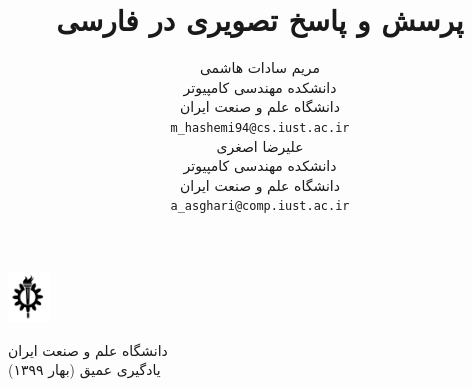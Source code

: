 \documentclass{article}
\title{پرسش و پاسخ تصویری در فارسی}
\author{%
  مریم سادات هاشمی \\
  دانشکده مهندسی کامپیوتر\\
  دانشگاه علم و صنعت ایران\\
  \texttt{m\_hashemi94@cs.iust.ac.ir} \\
   \And
    علیرضا اصغری \\
   دانشکده مهندسی کامپیوتر\\
   دانشگاه علم و صنعت ایران\\
    \texttt{a\_asghari@comp.iust.ac.ir}
}
\begin{document}
\begin{minipage}{0.1\textwidth}%
\includegraphics[width=1.1cm]{iust_logo.png}
\end{minipage}%
\hfill%
\begin{minipage}{0.9\textwidth}\raggedleft
دانشگاه علم و صنعت ایران\\
یادگیری عمیق (بهار ۱۳۹۹)\\
\end{minipage}


\makepertitle








\end{document}
